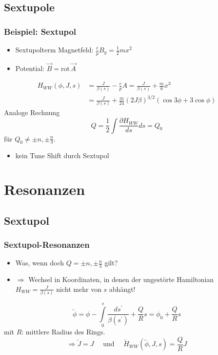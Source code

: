 \documentclass[hyperref={pdfpagelabels=false}]{beamer}
\begin{document}
\subsection{Sextupole}
\begin{frame}
\frametitle{Beispiel: Sextupol}
\begin{itemize}
\item Sextupolterm Magnetfeld: $\frac{e}{p} B_y = \frac{1}{2}m x^2$
\item Potential: $\vec{B} = \text{rot}\, \vec{A}$
\end{itemize}
\pause
\begin{align*}
H_{WW}(\phi,J,s) &= \frac{J}{\beta(s)} - \frac{e}{p}A= \frac{J}{\beta(s)} + \frac{m}{6}x^3 \\ &= \frac{J}{\beta(s)} + \frac{m}{24}(2J\beta)^{3/2}\left(\cos 3\phi + 3\cos \phi\right)
\end{align*}
\pause
Analoge Rechnung
\begin{equation*}
Q = \frac{1}{2} \int \frac{\partial H_{WW}}{ds} ds =  Q_0
\end{equation*}
für $Q_0 \neq \pm n,\pm \frac{n}{3}$.
\vspace*{.5cm}
\pause
\begin{itemize}
\item kein Tune Shift durch Sextupol
\end{itemize}
\end{frame}




\section{Resonanzen}
\subsection{Sextupol}
\begin{frame}
\frametitle{Sextupol-Resonanzen}
\begin{itemize}
\item Was, wenn doch $Q = \pm n,\pm \frac{n}{3}$ gilt?
\item $\Rightarrow$ Wechsel in Koordinaten, in denen der ungestörte Hamiltonian $H_{WW} = \frac{J}{\beta(s)}$ nicht mehr von $s$ abhängt!
\end{itemize}
\pause
\begin{equation*}
\tilde{\phi} = \phi - \int\limits_0^s \frac{ds^\prime}{\beta(s^\prime)} + \frac{Q}{R}s = \phi_0 + \frac{Q}{R}s
\end{equation*}
mit $R$: mittlere Radius des Rings.
\vspace*{.2cm}
\pause
\begin{equation*}
\Rightarrow \tilde{J} = J \quad \text{ und }\quad \tilde{H}_{WW}(\tilde{\phi},J,s) = \frac{Q}{R}J
\end{equation*}
\end{frame}
\end{document}
